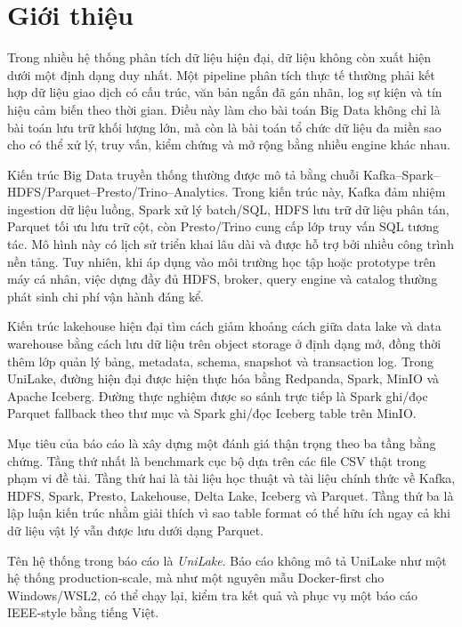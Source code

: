 \section{Giới thiệu}

Trong nhiều hệ thống phân tích dữ liệu hiện đại, dữ liệu không còn xuất hiện dưới một định dạng duy nhất. Một pipeline phân tích thực tế thường phải kết hợp dữ liệu giao dịch có cấu trúc, văn bản ngắn đã gán nhãn, log sự kiện và tín hiệu cảm biến theo thời gian. Điều này làm cho bài toán Big Data không chỉ là bài toán lưu trữ khối lượng lớn, mà còn là bài toán tổ chức dữ liệu đa miền sao cho có thể xử lý, truy vấn, kiểm chứng và mở rộng bằng nhiều engine khác nhau.

Kiến trúc Big Data truyền thống thường được mô tả bằng chuỗi Kafka--Spark--HDFS/Parquet--Presto/Trino--Analytics. Trong kiến trúc này, Kafka đảm nhiệm ingestion dữ liệu luồng, Spark xử lý batch/SQL, HDFS lưu trữ dữ liệu phân tán, Parquet tối ưu lưu trữ cột, còn Presto/Trino cung cấp lớp truy vấn SQL tương tác. Mô hình này có lịch sử triển khai lâu dài và được hỗ trợ bởi nhiều công trình nền tảng. Tuy nhiên, khi áp dụng vào môi trường học tập hoặc prototype trên máy cá nhân, việc dựng đầy đủ HDFS, broker, query engine và catalog thường phát sinh chi phí vận hành đáng kể.

Kiến trúc lakehouse hiện đại tìm cách giảm khoảng cách giữa data lake và data warehouse bằng cách lưu dữ liệu trên object storage ở định dạng mở, đồng thời thêm lớp quản lý bảng, metadata, schema, snapshot và transaction log. Trong UniLake, đường hiện đại được hiện thực hóa bằng Redpanda, Spark, MinIO và Apache Iceberg. Đường thực nghiệm được so sánh trực tiếp là Spark ghi/đọc Parquet fallback theo thư mục và Spark ghi/đọc Iceberg table trên MinIO.

Mục tiêu của báo cáo là xây dựng một đánh giá thận trọng theo ba tầng bằng chứng. Tầng thứ nhất là benchmark cục bộ dựa trên các file CSV thật trong phạm vi đề tài. Tầng thứ hai là tài liệu học thuật và tài liệu chính thức về Kafka, HDFS, Spark, Presto, Lakehouse, Delta Lake, Iceberg và Parquet. Tầng thứ ba là lập luận kiến trúc nhằm giải thích vì sao table format có thể hữu ích ngay cả khi dữ liệu vật lý vẫn được lưu dưới dạng Parquet.

Tên hệ thống trong báo cáo là \textit{UniLake}. Báo cáo không mô tả UniLake như một hệ thống production-scale, mà như một nguyên mẫu Docker-first cho Windows/WSL2, có thể chạy lại, kiểm tra kết quả và phục vụ một báo cáo IEEE-style bằng tiếng Việt.

